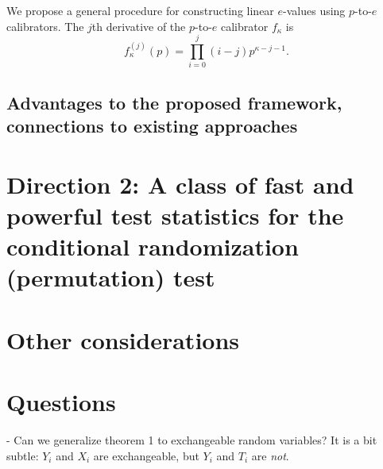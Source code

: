 \documentclass[12pt]{article}
\begin{document}
We propose a general procedure for constructing linear $e$-values using $p$-to-$e$ calibrators. The $j$th derivative of the $p$-to-$e$ calibrator $f_\kappa$ is $$f_\kappa^{(j)}(p) = \prod_{i=0}^j (i - j)p^{\kappa - j - 1}.$$

\subsection*{Advantages to the proposed framework, connections to existing approaches}

\section*{Direction 2: A class of fast and powerful test statistics for the conditional randomization (permutation) test}

\section{Other considerations}
\section{Questions}
- Can we generalize theorem 1 to exchangeable random variables? It is a bit subtle: $Y_i$ and $X_i$ are exchangeable, but $Y_i$ and $T_i$ are \textit{not}.
\end{document}
